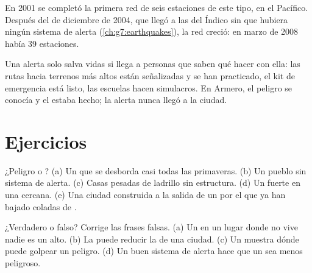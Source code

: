 \begin{history}
En 2001 se completó la primera red de seis estaciones de este tipo, en el
 Pacífico. Después del  de diciembre de 2004, que llegó a las
 del  Índico sin que hubiera ningún sistema de alerta
(\cref{ch:g7:earthquakes}), la red creció: en marzo de 2008 había 39
estaciones.
\end{history}

Una alerta solo salva vidas si llega a personas que saben qué hacer con
ella: las rutas hacia terrenos más altos están señalizadas y se han
practicado, el kit de emergencia está listo, las escuelas hacen
simulacros. En Armero, el peligro se conocía y el  estaba hecho; la
alerta nunca llegó a la ciudad.

\section{Ejercicios}

\begin{exercise}[$\star$]\label{exo:g9:natural-risks:1}
¿Peligro o ? (a) Un  que se desborda casi todas las
primaveras. (b) Un pueblo sin sistema de alerta. (c) Casas pesadas de
ladrillo sin estructura. (d) Un fuerte  en una  cercana.
(e) Una ciudad construida a la salida de un  por el que ya han bajado
coladas de .
\end{exercise}

\begin{exercise}[$\star$]\label{exo:g9:natural-risks:2}
¿Verdadero o falso? Corrige las frases falsas. (a) Un  en
un lugar donde no vive nadie es un  alto. (b) La  puede
reducir la  de una ciudad. (c) Un 
muestra dónde puede golpear un peligro. (d) Un buen sistema de alerta hace
que un  sea menos peligroso.
\end{exercise}

